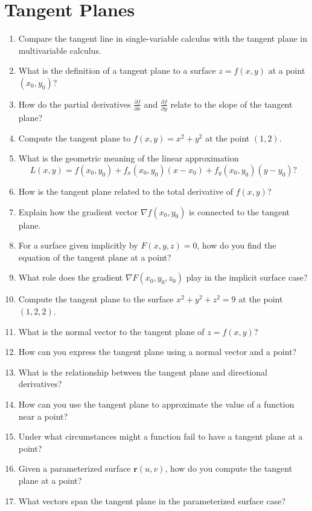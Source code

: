 \section{Tangent Planes}

\begin{enumerate}
  \item Compare the tangent line in single-variable calculus with the tangent plane in multivariable calculus.
  \item What is the definition of a tangent plane to a surface \(z = f(x,y)\) at a point \((x_{0}, y_{0})\)?
  \item How do the partial derivatives \(\frac{\partial f}{\partial x}\) and \(\frac{\partial f}{\partial y}\) relate to the slope of the tangent plane?
  \item Compute the tangent plane to \(f(x,y) = x^{2} + y^{2}\) at the point \((1,2)\).
  \item What is the geometric meaning of the linear approximation
    \[ L(x,y) = f(x_{0},y_{0}) + f_{x}(x_{0},y_{0})(x - x_{0}) + f_{y}(x_{0},y_{0})(y - y_{0})? \]
  \item How is the tangent plane related to the total derivative of \(f(x,y)\)?
  \item Explain how the gradient vector \(\nabla f(x_{0},y_{0})\) is connected to the tangent plane.
  \item For a surface given implicitly by \(F(x,y,z)=0\), how do you find the equation of the tangent plane at a point?
  \item What role does the gradient \(\nabla F(x_{0},y_{0},z_{0})\) play in the implicit surface case?
  \item Compute the tangent plane to the surface \(x^{2} + y^{2} + z^{2} = 9\) at the point \((1,2,2)\).
  \item What is the normal vector to the tangent plane of \(z = f(x,y)\)?
  \item How can you express the tangent plane using a normal vector and a point?
  \item What is the relationship between the tangent plane and directional derivatives?
  \item How can you use the tangent plane to approximate the value of a function near a point?
  \item Under what circumstances might a function fail to have a tangent plane at a point?
  \item Given a parameterized surface \(\mathbf{r}(u,v)\), how do you compute the tangent plane at a point?
  \item What vectors span the tangent plane in the parameterized surface case?

\end{enumerate}
